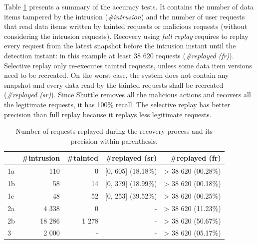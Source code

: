 Table \ref{tab:accuracy} presents a summary of the accuracy tests. It contains the number of data items tampered by the intrusion (\emph{\#intrusion}) and the number of user requests that read data items written by  tainted requests or malicious requests (without considering the intrusion requests). Recovery using \textit{full replay} requires to replay every request from the latest snapshot before the intrusion instant until the detection instant: in this example at least 38 620 requests (\emph{\#replayed (fr)}). Selective replay only re-executes tainted requests, unless some data item versions need to be recreated. On the worst case, the system does not contain any snapshot and every data read by the tainted requests shall be recreated (\emph{\#replayed (sr)}). Since Shuttle removes all the malicious actions and recovers all the legitimate requests, it has 100\% recall. The selective replay has better precision than full replay because it replays less legitimate requests.

\begin{table}
\centering
\begin{tabular}{l|rrrr}
    & \#intrusion & \#tainted & \#replayed (sr)               & \#replayed (fr)   \\ \hline
1a       & 110          & 0          & [0, 605] (18.18\%)   & > 38 620 (00.28\%)  \\
1b       & 58           & 14         & [0, 379] (18.99\%)   & > 38 620 (00.18\%)  \\
1c       & 48           & 52         & [0, 253] (39.52\%)   & > 38 620 (00.25\%)  \\
2a       & 4 338        & 0          &  -                   & > 38 620 (11.23\%)  \\
2b       & 18 286       & 1 278      &  -                   & > 38 620 (50.67\%)  \\
3        & 2 000        & -          &  -                   & > 38 620 (05.17\%)  \\
\end{tabular}
  \caption{Number of requests replayed during the recovery process and its precision within parenthesis.}
  \label{tab:accuracy}
  \vspace{-5mm}
\end{table}






